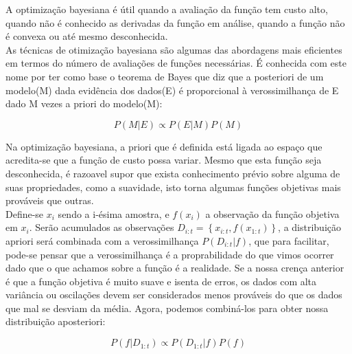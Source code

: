 \documentclass[
	12pt,				%
	openright,			%
	twoside,			%
	a4paper,			%
	english,			%
	french,				%
	spanish,			%
	brazil,				%
]{abntex2}
\begin{document}
A optimização bayesiana é útil quando a avaliação da função tem custo
alto, quando não é conhecido as derivadas da função em análise, quando a
função não é convexa ou até mesmo desconhecida.\\

As técnicas de otimização bayesiana são algumas das abordagens mais
eficientes em termos do número de avaliações de funções necessárias. É
conhecida com este nome por ter como base o teorema de Bayes que diz que
a posteriori de um modelo(M) dada evidência dos dados(E) é proporcional
à verossimilhança de E dado M vezes a priori do modelo(M):

\[
P(M|E) \propto P(E|M)P(M)
\]

Na optimização bayesiana, a priori que é definida está ligada ao espaço
que acredita-se que a função de custo possa variar. Mesmo que esta
função seja desconhecida, é razoavel supor que exista conhecimento
prévio sobre alguma de suas propriedades, como a suavidade, isto torna
algumas funções objetivas mais prováveis que outras.\\

Define-se \(x_i\) sendo a i-ésima amostra, e \(f(x_i)\) a observação da
função objetiva em \(x_i\). Serão acumulados as observações
\(D_{i:t}=\left\{ x_{i:t},f(x_{1:t}) \right\}\), a distribuição apriori
será combinada com a verossimilhança \(P(D_{i:t}|f)\), que para
facilitar, pode-se pensar que a verossimilhança é a proprabilidade do
que vimos ocorrer dado que o que achamos sobre a função é a realidade.
Se a nossa crença anterior é que a função objetiva é muito suave e
isenta de erros, os dados com alta variância ou oscilações devem ser
considerados menos prováveis do que os dados que mal se desviam da
média. Agora, podemos combiná-los para obter nossa distribuição
aposteriori:

\[
P(f|D_{1:t}) \propto P(D_{1:t}|f)P(f)
\]
\end{document}
